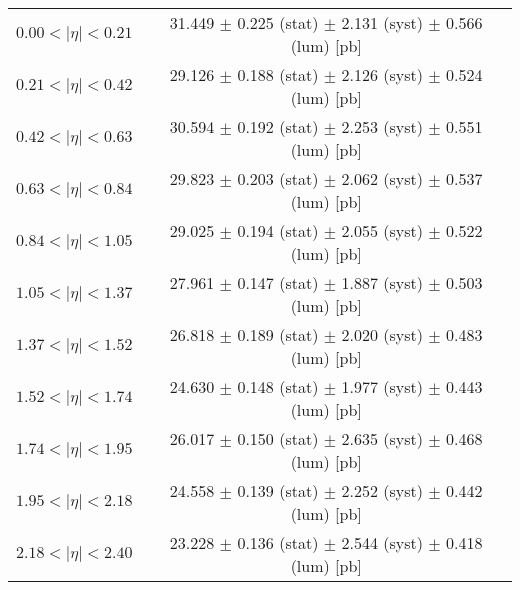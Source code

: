 \begin{tabular}{lc}
\hline
$0.00 < |\eta| <0.21$          & 31.449 $\pm$ 0.225 (stat) $\pm$ 2.131 (syst) $\pm$ 0.566 (lum) [pb]  \\
$0.21 < |\eta| <0.42$          & 29.126 $\pm$ 0.188 (stat) $\pm$ 2.126 (syst) $\pm$ 0.524 (lum) [pb]  \\
$0.42 < |\eta| <0.63$          & 30.594 $\pm$ 0.192 (stat) $\pm$ 2.253 (syst) $\pm$ 0.551 (lum) [pb]  \\
$0.63 < |\eta| <0.84$          & 29.823 $\pm$ 0.203 (stat) $\pm$ 2.062 (syst) $\pm$ 0.537 (lum) [pb]  \\
$0.84 < |\eta| <1.05$          & 29.025 $\pm$ 0.194 (stat) $\pm$ 2.055 (syst) $\pm$ 0.522 (lum) [pb]  \\
$1.05 < |\eta| <1.37$          & 27.961 $\pm$ 0.147 (stat) $\pm$ 1.887 (syst) $\pm$ 0.503 (lum) [pb]  \\
$1.37 < |\eta| <1.52$          & 26.818 $\pm$ 0.189 (stat) $\pm$ 2.020 (syst) $\pm$ 0.483 (lum) [pb]  \\
$1.52 < |\eta| <1.74$          & 24.630 $\pm$ 0.148 (stat) $\pm$ 1.977 (syst) $\pm$ 0.443 (lum) [pb]  \\
$1.74 < |\eta| <1.95$          & 26.017 $\pm$ 0.150 (stat) $\pm$ 2.635 (syst) $\pm$ 0.468 (lum) [pb]  \\
$1.95 < |\eta| <2.18$          & 24.558 $\pm$ 0.139 (stat) $\pm$ 2.252 (syst) $\pm$ 0.442 (lum) [pb]  \\
$2.18 < |\eta| <2.40$          & 23.228 $\pm$ 0.136 (stat) $\pm$ 2.544 (syst) $\pm$ 0.418 (lum) [pb]  \\
\hline
\end{tabular}
